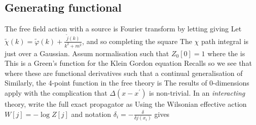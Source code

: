 \documentclass{article}
\begin{document}
\subsection{Generating functional}
The free field action with a source is 
Fourier transform by letting 
giving 
Let $\tilde{\chi}(k) = \tilde{\varphi}(k) + \frac{\tilde{j}(k)}{k^2+m^2}$, and so completing the square
The $\chi$ path integral is just over a Gaussian. Assum normalisation such that $Z_0[0]=1$ 
where the  is 
This is a Green's function for the Klein Gordon equation
Recalls 
so we see that 
where these are functional derivatives such that 
a continual generalisation of 
Similarly, the 4-point function in the free theory is 
The results of 0-dimensions apply with the complication that $\Delta(x-x^\prime)$ is non-trivial. 
In an \emph{interacting} theory, write the full exact propagator as 
Using the Wilsonian effective action $W[j] = -\log Z[j]$ and notation $\delta_i = - \frac{\delta}{\delta j(x_i)}$ gives 
\end{document}
